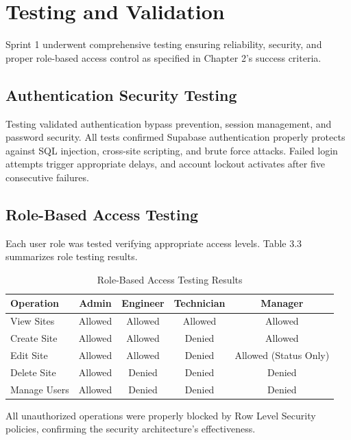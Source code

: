 \section{Testing and Validation}

Sprint 1 underwent comprehensive testing ensuring reliability, security, and proper role-based access control as specified in Chapter 2's success criteria.

\subsection{Authentication Security Testing}

Testing validated authentication bypass prevention, session management, and password security. All tests confirmed Supabase authentication properly protects against SQL injection, cross-site scripting, and brute force attacks. Failed login attempts trigger appropriate delays, and account lockout activates after five consecutive failures.

\subsection{Role-Based Access Testing}

Each user role was tested verifying appropriate access levels. Table 3.3 summarizes role testing results.

\begin{table}[H]
\centering
\small
\begin{tabular}{|l|c|c|c|c|}
\hline
\textbf{Operation} & \textbf{Admin} & \textbf{Engineer} & \textbf{Technician} & \textbf{Manager} \\
\hline
View Sites & Allowed & Allowed & Allowed & Allowed \\
\hline
Create Site & Allowed & Allowed & Denied & Allowed \\
\hline
Edit Site & Allowed & Allowed & Denied & Allowed (Status Only) \\
\hline
Delete Site & Allowed & Denied & Denied & Denied \\
\hline
Manage Users & Allowed & Denied & Denied & Denied \\
\hline
\end{tabular}
\caption{Role-Based Access Testing Results}
\label{tab:role_testing}
\end{table}

All unauthorized operations were properly blocked by Row Level Security policies, confirming the security architecture's effectiveness.

